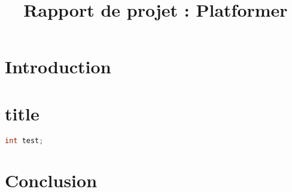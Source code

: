 \documentclass[12pt]{article}
\title{Rapport de projet : Platformer}
\begin{document}
\maketitle
\tableofcontents
\newpage

\section{Introduction}

\section{title}
	\begin{lstlisting}[language=C, title={Programme en C}]
		int test;
	\end{lstlisting}

\section{Conclusion}
	
\end{document}
